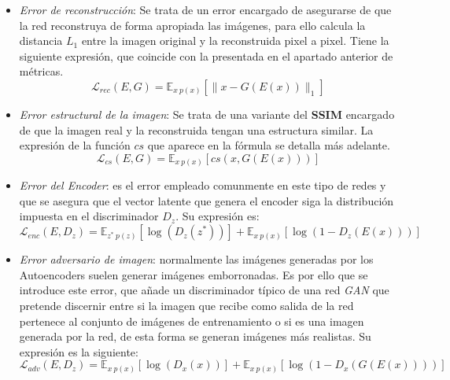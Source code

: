             \begin{itemize}
                \item \textit{Error de reconstrucción}: Se trata de un error encargado de asegurarse de que la red reconstruya de forma apropiada las imágenes, para ello calcula la distancia $L_1$ entre la imagen original y la reconstruida pixel a pixel. Tiene la siguiente expresión, que coincide con la presentada en el apartado anterior de métricas.
                \begin{equation}
                    \mathcal{L}_{rec}(E,G)= \mathbb{E}_{x~p(x)}\left[\|x- G(E(x)) \|_1\right]
                \end{equation}
                \item \textit{Error estructural de la imagen}: Se trata de una variante del \textbf{SSIM} encargado de que la imagen real y la reconstruida tengan una estructura similar. La expresión de la función $cs$ que aparece en la fórmula se detalla más adelante.
                \begin{equation}
                    \mathcal{L}_{cs}(E,G)= \mathbb{E}_{x~p(x)}\left[cs(x, G(E(x)))\right]
                \end{equation}
                \item \textit{Error del Encoder}: es el error empleado comunmente en este tipo de redes y que se asegura que el vector latente que genera el encoder siga la distribución impuesta en el discriminador $D_z$. Su expresión es:
                \begin{equation}
                    \mathcal{L}_{enc}(E,D_z)=\mathbb{E}_{z^*~p(z)}[\log(D_z(z^*))] + \mathbb{E}_{x~p(x)}[\log(1-D_z(E(x)))]
                \end{equation}
                \item \textit{Error adversario de imagen}: normalmente las imágenes generadas por los Autoencoders suelen generar imágenes emborronadas. Es por ello que se introduce este error, que añade un discriminador típico de una red \textit{GAN} que pretende discernir entre si la imagen que recibe como salida de la red pertenece al conjunto de imágenes de entrenamiento o si es una imagen generada por la red, de esta forma se generan imágenes más realistas. Su expresión es la siguiente: 
                \begin{equation}
                    \mathcal{L}_{adv}(E,D_z)=\mathbb{E}_{x~p(x)}[\log(D_x(x))] + \mathbb{E}_{x~p(x)}[\log(1-D_x(G(E(x))))]
                \end{equation}
            \end{itemize}

